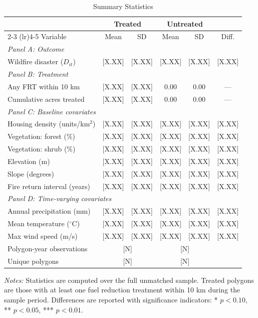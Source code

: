 \documentclass[12pt, letterpaper]{article}
\begin{document}
\begin{table}[H]
\centering
\small
\begin{threeparttable}
\caption{Summary Statistics}
\label{tab:summary}
\begin{tabular}{lccccc}
\toprule
& \multicolumn{2}{c}{Treated} & \multicolumn{2}{c}{Untreated} & \\
\cmidrule(lr){2-3} \cmidrule(lr){4-5}
Variable & Mean & SD & Mean & SD & Diff. \\
\midrule
\multicolumn{6}{l}{\textit{Panel A: Outcome}} \\
Wildfire disaster ($D_{it}$) & [X.XX] & [X.XX] & [X.XX] & [X.XX] & [X.XX] \\
[0.5em]
\multicolumn{6}{l}{\textit{Panel B: Treatment}} \\
Any FRT within 10 km & [X.XX] & [X.XX] & 0.00 & 0.00 & --- \\
Cumulative acres treated & [X.XX] & [X.XX] & 0.00 & 0.00 & --- \\
[0.5em]
\multicolumn{6}{l}{\textit{Panel C: Baseline covariates}} \\
Housing density (units/km$^2$) & [X.XX] & [X.XX] & [X.XX] & [X.XX] & [X.XX] \\
Vegetation: forest (\%) & [X.XX] & [X.XX] & [X.XX] & [X.XX] & [X.XX] \\
Vegetation: shrub (\%) & [X.XX] & [X.XX] & [X.XX] & [X.XX] & [X.XX] \\
Elevation (m) & [X.XX] & [X.XX] & [X.XX] & [X.XX] & [X.XX] \\
Slope (degrees) & [X.XX] & [X.XX] & [X.XX] & [X.XX] & [X.XX] \\
Fire return interval (years) & [X.XX] & [X.XX] & [X.XX] & [X.XX] & [X.XX] \\
[0.5em]
\multicolumn{6}{l}{\textit{Panel D: Time-varying covariates}} \\
Annual precipitation (mm) & [X.XX] & [X.XX] & [X.XX] & [X.XX] & [X.XX] \\
Mean temperature ($^\circ$C) & [X.XX] & [X.XX] & [X.XX] & [X.XX] & [X.XX] \\
Max wind speed (m/s) & [X.XX] & [X.XX] & [X.XX] & [X.XX] & [X.XX] \\
\midrule
Polygon-year observations & \multicolumn{2}{c}{[N]} & \multicolumn{2}{c}{[N]} & \\
Unique polygons & \multicolumn{2}{c}{[N]} & \multicolumn{2}{c}{[N]} & \\
\bottomrule
\end{tabular}
\begin{tablenotes}
\small
\item \textit{Notes:} Statistics are computed over the full unmatched sample. Treated polygons are those with at least one fuel reduction treatment within 10 km during the sample period. Differences are reported with significance indicators: * $p<0.10$, ** $p<0.05$, *** $p<0.01$.
\end{tablenotes}
\end{threeparttable}
\end{table}
\end{document}
